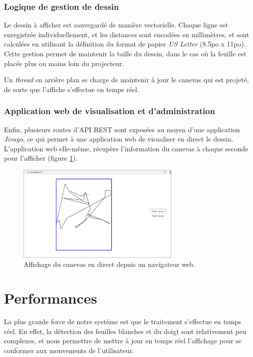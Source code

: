\documentclass[11pt]{report}
\begin{document}

\subsubsection{Logique de gestion de dessin}

Le dessin à afficher est sauvegardé de manière vectorielle. Chaque ligne est
enregistrée individuellement, et les distances sont encodées en millimètres, et
sont calculées en utilisant la définition du format de papier \textit{US
  Letter} (8.5po x 11po). Cette gestion permet de maintenir la taille du dessin,
dans le cas où la feuille est placée plus ou moins loin du projecteur.

Un \textit{thread} en arrière plan se charge de maintenir à jour le canevas qui
est projeté, de sorte que l'affiche s'effectue en temps réel. 

\subsubsection{Application web de visualisation et d'administration}

Enfin, plusieurs routes d'API REST sont exposées au moyen d'une application
\textit{Jivago}, ce qui permet à une application web de visualiser en direct le
dessin. L'application web elle-même, récupère l'information du canevas à chaque
seconde pour l'afficher (figure \ref{web_ui}). 

\begin{figure}
  \centering
  \includegraphics[width=8cm]{web-canvas.png}
  \caption{Affichage du canevas en direct depuis un navigateur web.}
  \label{web_ui}
  \end{figure}

\section{Performances}
La plus grande force de notre système est que le traitement s'effectue en temps
réel. En effet, la détection des feuilles blanches et du doigt sont relativement
peu complexes, et nous permettre de mettre à jour en temps réel l'affichage pour
se conformer aux mouvements de l'utilisateur.
\end{document}
